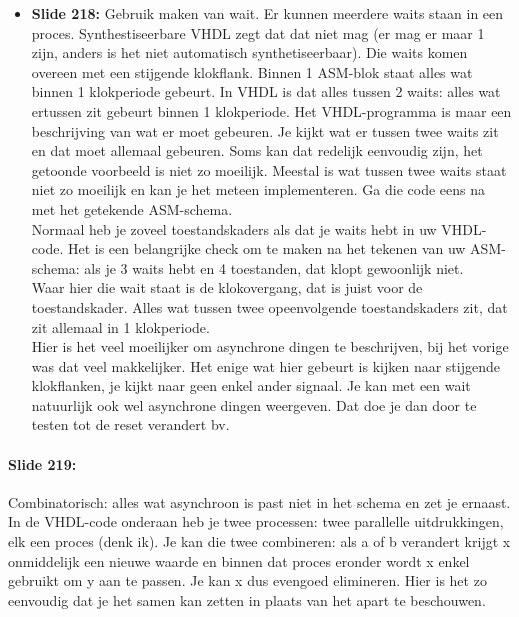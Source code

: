 \documentclass[10pt,a4paper]{book}
\begin{document}
\begin{itemize}
\item \textbf{Slide 218:} Gebruik maken van wait. Er kunnen meerdere waits staan in een proces. Synthestiseerbare VHDL zegt dat dat niet mag (er mag er maar 1 zijn, anders is het niet automatisch synthetiseerbaar). Die waits komen overeen met een stijgende klokflank. Binnen 1 ASM-blok staat alles wat binnen 1 klokperiode gebeurt. In VHDL is dat alles tussen 2 waits: alles wat ertussen zit gebeurt binnen 1 klokperiode. Het VHDL-programma is maar een beschrijving van wat er moet gebeuren. Je kijkt wat er tussen twee waits zit en dat moet allemaal gebeuren. Soms kan dat redelijk eenvoudig zijn, het getoonde voorbeeld is niet zo moeilijk. Meestal is wat tussen twee waits staat niet zo moeilijk en kan je het meteen implementeren. Ga die code eens na met het getekende ASM-schema.\\
Normaal heb je zoveel toestandskaders als dat je waits hebt in uw VHDL-code. Het is een belangrijke check om te maken na het tekenen van uw ASM-schema: als je 3 waits hebt en 4 toestanden, dat klopt gewoonlijk niet.\\ %
Waar hier die wait staat is de klokovergang, dat is juist voor de toestandskader. Alles wat tussen twee opeenvolgende toestandskaders zit, dat zit allemaal in 1 klokperiode.\\
Hier is het veel moeilijker om asynchrone dingen te beschrijven, bij het vorige was dat veel makkelijker. Het enige wat hier gebeurt is kijken naar stijgende klokflanken, je kijkt naar geen enkel ander signaal. Je kan met een wait natuurlijk ook wel asynchrone dingen weergeven. Dat doe je dan door te testen tot de reset verandert bv. 
\end{itemize}

\paragraph{Slide 219:} Combinatorisch: alles wat asynchroon is past niet in het schema en zet je ernaast. In de VHDL-code onderaan heb je twee processen: twee parallelle uitdrukkingen, elk een proces (denk ik). Je kan die twee combineren: als a of b verandert krijgt x onmiddelijk een nieuwe waarde en binnen dat proces eronder wordt x enkel gebruikt om y aan te passen. Je kan x dus evengoed elimineren. Hier is het zo eenvoudig dat je het samen kan zetten in plaats van het apart te beschouwen.
\end{document}
